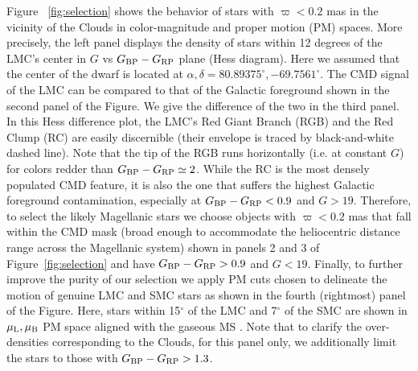 \documentclass[a4paper,useAMS,usenatbib]{mnras}
\begin{document}
Figure ~\ref{fig:selection} shows the behavior of stars with
$\varpi<0.2$ mas in the vicinity of the Clouds in color-magnitude and
proper motion (PM) spaces. More precisely, the left panel displays the
density of stars within 12 degrees of the LMC's center in $G$ vs
$G_{\rm BP}-G_{\rm RP}$ plane (Hess diagram). Here we assumed that the
center of the dwarf is located at $\alpha, \delta =
80.89375^{\circ},-69.7561^{\circ}$. The CMD signal of the LMC can be
compared to that of the Galactic foreground shown in the second panel
of the Figure. We give the difference of the two in the third
panel. In this Hess difference plot, the LMC's Red Giant Branch (RGB)
and the Red Clump (RC) are easily discernible (their envelope is
traced by black-and-white dashed line). Note that the tip of the RGB
runs horizontally (i.e. at constant $G$) for colors redder than
$G_{\rm BP}-G_{\rm RP} \simeq 2$. While the RC is the most densely
populated CMD feature, it is also the one that suffers the highest
Galactic foreground contamination, especially at $G_{\rm BP}-G_{\rm
  RP}<0.9$ and $G>19$. Therefore, to select the likely Magellanic
stars we choose objects with $\varpi<0.2$ mas that fall within the CMD
mask (broad enough to accommodate the heliocentric distance range
across the Magellanic system) shown in panels 2 and 3 of
Figure~\ref{fig:selection} and have $G_{\rm BP}-G_{\rm RP}>0.9$ and
$G<19$. Finally, to further improve the purity of our selection we
apply PM cuts chosen to delineate the motion of genuine LMC
and SMC stars as shown in the fourth (rightmost) panel of the
Figure. Here, stars within 15$^{\circ}$ of the LMC and 7$^{\circ}$ of
the SMC are shown in $\mu_{\rm L}, \mu_{\rm B}$ PM space
aligned with the gaseous MS \citep[see][for the definition of the
  $L_{\rm MS}, B_{\rm MS}$ coordinate system]{Nidever2008}. Note that
to clarify the over-densities corresponding to the Clouds, for this
panel only, we additionally limit the stars to those with $G_{\rm
  BP}-G_{\rm RP}>1.3$.
\end{document}
